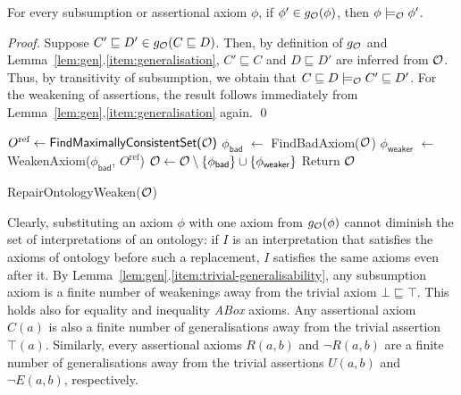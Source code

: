 \documentclass[
]{ceurart}
\begin{document}
\begin{lemma} For every subsumption or assertional axiom $\phi$, if $\phi' \in g_\mathcal{O}(\phi)$, then $\phi \models_\mathcal{O} \phi'$.
\end{lemma}


\begin{proof}
Suppose $C' \sqsubseteq D' \in g_\mathcal{O}(C \sqsubseteq D)$. Then, by definition of $g_\mathcal{O}$ and Lemma~\ref{lem:gen}.\ref{item:generalisation}, $C'\sqsubseteq C$ and $D \sqsubseteq D'$ are inferred from $\mathcal{O}$. Thus, by transitivity of subsumption, we obtain that $C \sqsubseteq D \models_\mathcal{O} C' \sqsubseteq D'$. For the weakening of assertions, the result follows immediately from Lemma~\ref{lem:gen}.\ref{item:generalisation} again.
\qed\end{proof}



\begin{algorithm}[t]
\begin{algorithmic}
\State $O^\text{ref} \gets \textsf{FindMaximallyConsistentSet($\mathcal{O}$)}$
\State $\phi_\textsf{bad}$ $\gets$ \textsf{FindBadAxiom}($\mathcal{O}$)
\State $\phi_\textsf{weaker}$ $\gets$ \textsf{WeakenAxiom}($\phi_\textsf{bad}$, $O^\text{ref}$)
\State $\mathcal{O} \gets \mathcal{O} \setminus \{\phi_\textsf{bad}\} \cup \{\phi_\textsf{weaker}\}$
\EndWhile
\State Return $\mathcal{O}$
\end{algorithmic}
\caption{RepairOntologyWeaken($\mathcal{O}$)}
	\label{algo:repair_weaken}
\end{algorithm}

Clearly, substituting an axiom $\phi$ with one axiom from $g_\mathcal{O}(\phi)$ cannot diminish the set of interpretations of an ontology: if $I$ is an interpretation that satisfies the axioms of ontology before such a replacement, $I$ satisfies the same axioms even after it. 
%
By Lemma~\ref{lem:gen}.\ref{item:trivial-generalisability}, any subsumption axiom is a finite number of weakenings away from the trivial axiom $\bot \sqsubseteq \top$. This holds also for equality and inequality \emph{ABox} axioms. Any assertional axiom $C(a)$ is also a finite number of generalisations away from the trivial assertion $\top(a)$. Similarly, every assertional axioms $R(a,b)$ and $\lnot R(a,b)$ are a finite number of generalisations away from the trivial assertions $U(a,b)$ and $\lnot E(a,b)$, respectively. 

\end{document}
